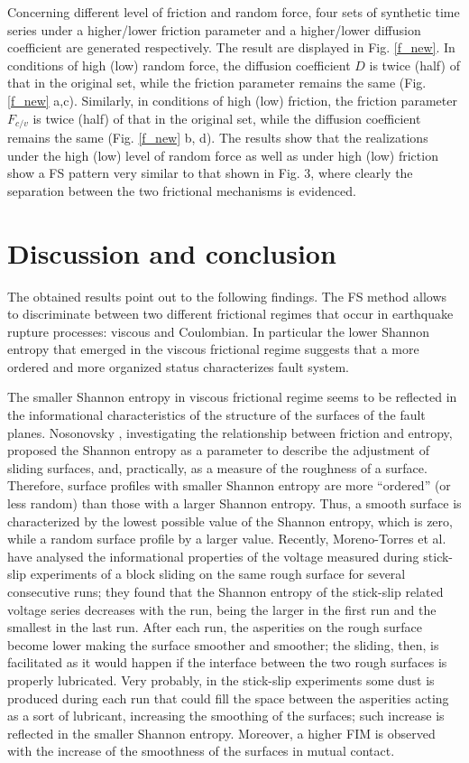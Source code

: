\documentclass[%
 aip,
rsi,%
 amsmath,amssymb,
 reprint,%
]{revtex4-1}
\begin{document}
Concerning different level of friction and random force, four sets of synthetic time series under a higher/lower friction parameter and a higher/lower diffusion coefficient are generated respectively.
The result are displayed in Fig. \ref{f_new}.
In conditions of high (low) random force, the diffusion coefficient $D$ is twice (half) of that in the original set, while the friction parameter remains the same (Fig. \ref{f_new} a,c).
Similarly, in conditions of high (low) friction, the friction parameter $F_{c/v}$ is twice (half) of that in the original set, while the diffusion coefficient remains the same (Fig. \ref{f_new} b, d). The results show that the realizations under the high (low) level of random force as well as under high (low) friction show a FS pattern very similar to that shown in Fig. 3, where clearly the separation between the two frictional mechanisms is evidenced.


\section{Discussion and conclusion}
The obtained results point out to the following findings. The FS method allows to discriminate between two different frictional regimes that occur in earthquake rupture processes: viscous and Coulombian. In particular the lower Shannon entropy that emerged in the viscous frictional regime suggests that a more ordered and more organized status characterizes fault system.

The smaller Shannon entropy in viscous frictional regime seems to be reflected in the informational characteristics of the structure of the surfaces of the fault planes. Nosonovsky \cite{nosonovsky_entropy_2010}, investigating the relationship between friction and entropy, proposed the Shannon entropy as a parameter to describe the adjustment of sliding surfaces, and, practically, as a measure of the roughness of a surface. Therefore, surface profiles with smaller Shannon entropy are  more “ordered” (or less random) than those with a larger Shannon entropy. Thus, a smooth surface is characterized by the lowest possible value of the Shannon entropy, which is zero, while a random surface profile by a larger value. Recently, Moreno-Torres et al. \cite{moreno-torres_investigating_2018} have analysed the informational properties of the voltage measured during stick-slip experiments of a block sliding on the same rough surface for several consecutive runs; they found that the Shannon entropy of the stick-slip related voltage series decreases with the run, being the larger in the first run and the smallest in the last run. After each run, the asperities on the rough surface become lower making the surface smoother and smoother; the sliding, then, is facilitated as it would happen if the interface between the two rough surfaces is properly lubricated. Very probably, in the stick-slip experiments some dust is produced during each run that could fill the space between the asperities acting as a sort of lubricant, increasing the smoothing of the surfaces; such increase is reflected in the smaller Shannon entropy. Moreover, a higher FIM is observed with the increase of the smoothness of the surfaces in mutual contact.
\end{document}
